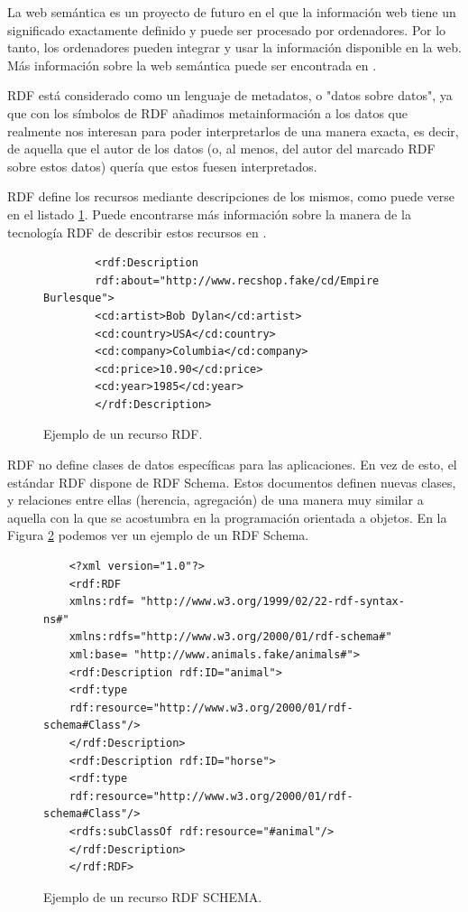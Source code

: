 La web semántica es un proyecto de futuro en el que la información web tiene un significado exactamente definido y puede ser procesado por ordenadores. Por lo tanto, los ordenadores pueden integrar y usar la información disponible en la web. Más información sobre la web semántica puede ser encontrada en \cite{iswc2007}.

RDF está considerado como un lenguaje de metadatos, o "datos sobre datos", ya que con los símbolos de RDF añadimos metainformación a los datos que realmente nos interesan para poder interpretarlos de una manera exacta, es decir, de aquella que el autor de los datos (o, al menos, del autor del marcado RDF sobre estos datos) quería que estos fuesen interpretados.

RDF define los recursos mediante descripciones de los mismos, como puede verse en el listado \ref{fig:ejemploRDF1}. Puede encontrarse más información sobre la manera de la tecnología RDF de describir estos recursos en \cite{champin2002rdf}.

\begin{figure}[h]
	\centering
	\begin{verbatim}
		<rdf:Description
		rdf:about="http://www.recshop.fake/cd/Empire Burlesque">
		<cd:artist>Bob Dylan</cd:artist>
		<cd:country>USA</cd:country>
		<cd:company>Columbia</cd:company>
		<cd:price>10.90</cd:price>
		<cd:year>1985</cd:year>
		</rdf:Description>
	\end{verbatim}
	\caption{ Ejemplo de un recurso RDF.}
	\label{fig:ejemploRDF1}
\end{figure}


RDF no define clases de datos específicas para las aplicaciones. En vez de esto, el estándar RDF dispone de RDF Schema. Estos documentos definen nuevas clases, y relaciones entre ellas (herencia, agregación) de una manera muy similar a aquella con la que se acostumbra en la programación orientada a objetos. En la Figura \ref{fig:ejemploRDF2} podemos ver un ejemplo de un RDF Schema.

\begin{figure}[t]
	\centering
\begin{verbatim}
	<?xml version="1.0"?>
	<rdf:RDF
	xmlns:rdf= "http://www.w3.org/1999/02/22-rdf-syntax-ns#"
	xmlns:rdfs="http://www.w3.org/2000/01/rdf-schema#"
	xml:base= "http://www.animals.fake/animals#">
	<rdf:Description rdf:ID="animal">
	<rdf:type
	rdf:resource="http://www.w3.org/2000/01/rdf-schema#Class"/>
	</rdf:Description>
	<rdf:Description rdf:ID="horse">
	<rdf:type
	rdf:resource="http://www.w3.org/2000/01/rdf-schema#Class"/>
	<rdfs:subClassOf rdf:resource="#animal"/>
	</rdf:Description>
	</rdf:RDF>
\end{verbatim}
	\caption{ Ejemplo de un recurso RDF SCHEMA.}
	\label{fig:ejemploRDF2}
\end{figure}

